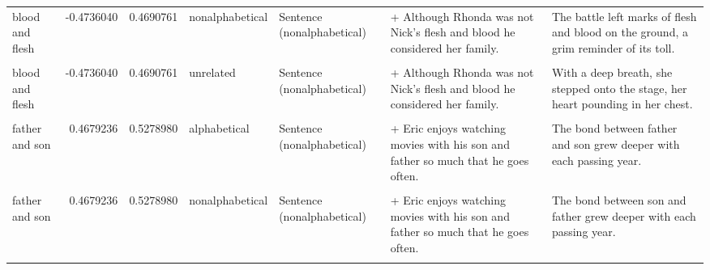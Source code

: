 \documentclass[
  12pt,
]{scrartcl}
\begin{document}
\begin{landscape}
\begin{longtable}{lrrllll}
\addlinespace
blood and flesh & -0.4736040 & 0.4690761 & nonalphabetical & Sentence (nonalphabetical) & + Although Rhonda was not Nick's flesh and blood he considered her family. & The battle left marks of flesh and blood on the ground, a grim reminder of its toll.\\
\cellcolor{gray!6}{blood and flesh} & \cellcolor{gray!6}{-0.4736040} & \cellcolor{gray!6}{0.4690761} & \cellcolor{gray!6}{unrelated} & \cellcolor{gray!6}{Sentence (alphabetical)} & \cellcolor{gray!6}{+ Although Rhonda was not Nick's blood and flesh he considered her family.} & \cellcolor{gray!6}{With a deep breath, she stepped onto the stage, her heart pounding in her chest.}\\
blood and flesh & -0.4736040 & 0.4690761 & unrelated & Sentence (nonalphabetical) & + Although Rhonda was not Nick's flesh and blood he considered her family. & With a deep breath, she stepped onto the stage, her heart pounding in her chest.\\
\cellcolor{gray!6}{father and son} & \cellcolor{gray!6}{0.4679236} & \cellcolor{gray!6}{0.5278980} & \cellcolor{gray!6}{alphabetical} & \cellcolor{gray!6}{Sentence (alphabetical)} & \cellcolor{gray!6}{+ Eric enjoys watching movies with his father and son so much that he goes often.} & \cellcolor{gray!6}{The bond between father and son grew deeper with each passing year.}\\
father and son & 0.4679236 & 0.5278980 & alphabetical & Sentence (nonalphabetical) & + Eric enjoys watching movies with his son and father so much that he goes often. & The bond between father and son grew deeper with each passing year.\\
\addlinespace
\cellcolor{gray!6}{father and son} & \cellcolor{gray!6}{0.4679236} & \cellcolor{gray!6}{0.5278980} & \cellcolor{gray!6}{nonalphabetical} & \cellcolor{gray!6}{Sentence (alphabetical)} & \cellcolor{gray!6}{+ Eric enjoys watching movies with his father and son so much that he goes often.} & \cellcolor{gray!6}{The bond between son and father grew deeper with each passing year.}\\
father and son & 0.4679236 & 0.5278980 & nonalphabetical & Sentence (nonalphabetical) & + Eric enjoys watching movies with his son and father so much that he goes often. & The bond between son and father grew deeper with each passing year.\\
\cellcolor{gray!6}{father and son} & \cellcolor{gray!6}{0.4679236} & \cellcolor{gray!6}{0.5278980} & \cellcolor{gray!6}{unrelated} & \cellcolor{gray!6}{Sentence (alphabetical)} & \cellcolor{gray!6}{+ Eric enjoys watching movies with his father and son so much that he goes often.} & \cellcolor{gray!6}{The dog wagged its tail eagerly, hoping for a treat.}\\

\end{longtable}
\end{landscape}
\end{document}
